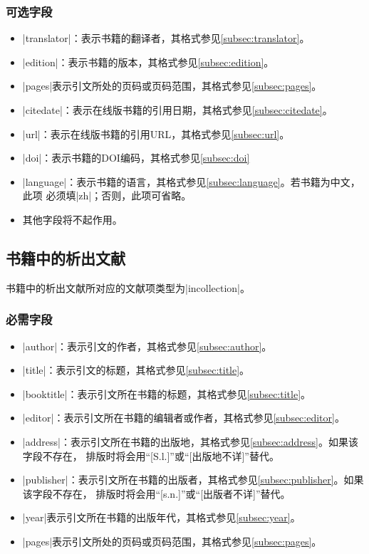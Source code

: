 \subsubsection{可选字段}

\begin{itemize}
\item |translator|：表示书籍的翻译者，其格式参见\ref{subsec:translator}。
\item |edition|：表示书籍的版本，其格式参见\ref{subsec:edition}。
\item |pages|表示引文所处的页码或页码范围，其格式参见\ref{subsec:pages}。
\item |citedate|：表示在线版书籍的引用日期，其格式参见\ref{subsec:citedate}。
\item |url|：表示在线版书籍的引用URL，其格式参见\ref{subsec:url}。
\item |doi|：表示书籍的DOI编码，其格式参见\ref{subsec:doi}
\item |language|：表示书籍的语言，其格式参见\ref{subsec:language}。若书籍为中文，此项
必须填|zh|；否则，此项可省略。
\item 其他字段将不起作用。
\end{itemize}

\subsection{书籍中的析出文献}

书籍中的析出文献所对应的{\BibTeX}文献项类型为|incollection|。

\subsubsection{必需字段}

\begin{itemize}
\item |author|：表示引文的作者，其格式参见\ref{subsec:author}。
\item |title|：表示引文的标题，其格式参见\ref{subsec:title}。
\item |booktitle|：表示引文所在书籍的标题，其格式参见\ref{subsec:title}。
\item |editor|：表示引文所在书籍的编辑者或作者，其格式参见\ref{subsec:editor}。
\item |address|：表示引文所在书籍的出版地，其格式参见\ref{subsec:address}。如果该字段不存在，
{\BibTeX}排版时将会用``[S.l.]''或``[出版地不详]''替代。
\item |publisher|：表示引文所在书籍的出版者，其格式参见\ref{subsec:publisher}。如果该字段不存在，
{\BibTeX}排版时将会用``[s.n.]''或``[出版者不详]''替代。
\item |year|表示引文所在书籍的出版年代，其格式参见\ref{subsec:year}。
\item |pages|表示引文所处的页码或页码范围，其格式参见\ref{subsec:pages}。
\end{itemize}

